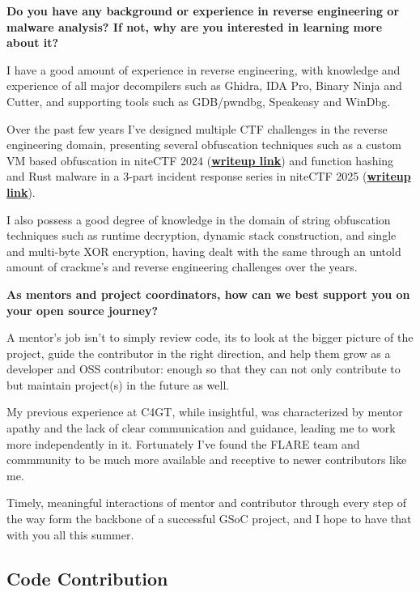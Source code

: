 \documentclass[12pt]{article}
\begin{document}
\textbf{Do you have any background or experience in reverse engineering or malware analysis? If not, why are you interested in learning more about it?}

I have a good amount of experience in reverse engineering, with knowledge and experience of all major decompilers such as Ghidra, IDA Pro, Binary Ninja and Cutter, and supporting tools such as GDB/pwndbg, Speakeasy and WinDbg.

Over the past few years I've designed multiple CTF challenges in the reverse engineering domain, presenting several obfuscation techniques such as a custom VM based obfuscation in niteCTF 2024 (\href{https://github.com/Cryptonite-MIT/niteCTF-2024/tree/main/rev/gate_keeping/solution}{\textbf{writeup link}}) and function hashing and Rust malware in a 3-part incident response series in niteCTF 2025 (\href{https://github.com/Cryptonite-MIT/niteCTF-2025/tree/main/forensics/ir_2_wiege}{\textbf{writeup link}}).

I also possess a good degree of knowledge in the domain of string obfuscation techniques such as runtime decryption, dynamic stack construction, and single and multi-byte XOR encryption, having dealt with the same through an untold amount of crackme's and reverse engineering challenges over the years.

\textbf{As mentors and project coordinators, how can we best support you on your open source journey?}

A mentor's job isn't to simply review code, its to look at the bigger picture of the project, guide the contributor in the right direction, and help them grow as a developer and OSS contributor: enough so that they can not only contribute to but maintain project(s) in the future as well.

My previous experience at C4GT, while insightful, was characterized by mentor apathy and the lack of clear communication and guidance, leading me to work more independently in it. Fortunately I've found the FLARE team and commmunity to be much more available and receptive to newer contributors like me.

Timely, meaningful interactions of mentor and contributor through every step of the way form the backbone of a successful GSoC project, and I hope to have that with you all this summer.

\subsection*{Code Contribution}
{}
\end{document}

